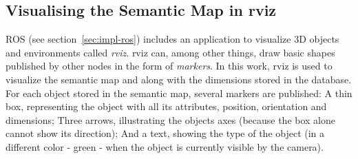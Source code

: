 \subsection{Visualising the Semantic Map in rviz}
ROS (see section~\ref{sec:impl-ros}) includes an application to visualize 3D objects and environments called \textit{rviz}. rviz can, among other things, draw basic shapes published by other nodes in the form of \textit{markers}. In this work, rviz is used to visualize the semantic map and along with the dimensions stored in the database. \\

For each object stored in the semantic map, several markers are published: A thin box, representing the object with all its attributes, position, orientation and dimensions; Three arrows, illustrating the objects axes (because the box alone cannot show its direction); And a text, showing the type of the object (in a different color - green - when the object is currently visible by the camera).

